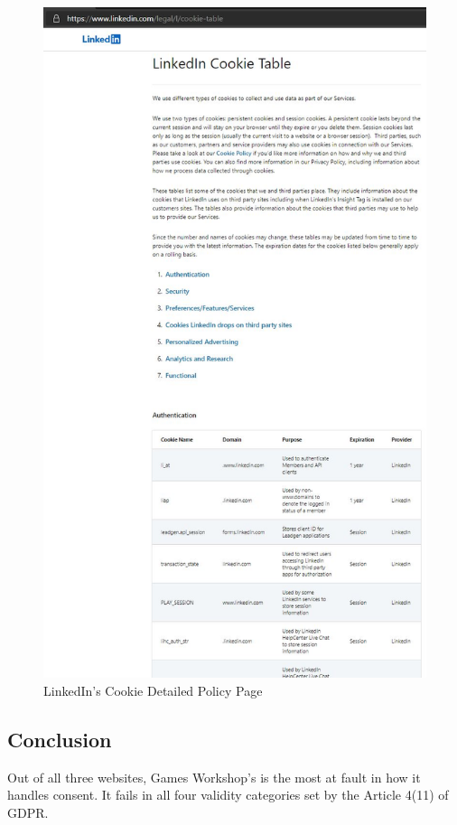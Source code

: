 \documentclass[twocolumn, letterpaper]{scrartcl}
\begin{document}
        \begin{figure}[tbp]	
        \includegraphics[width=0.9\linewidth]{ld_table.JPG}
        \caption{LinkedIn's Cookie Detailed Policy Page \label{fig:i}}
        \end{figure}
        
	\subsection*{Conclusion}
	
	Out of all three websites, Games Workshop's is the most at fault in how it handles consent. It fails in all four validity categories set by the Article 4(11) of GDPR.
	
\end{document}

